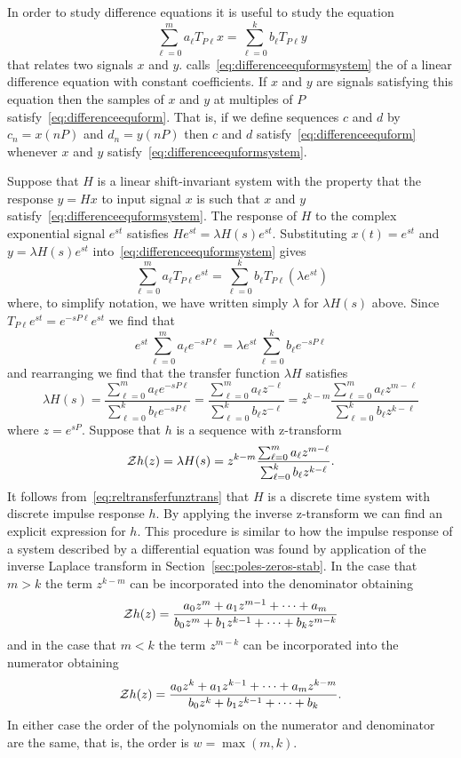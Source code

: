 In order to study difference equations it is useful to study the equation
\begin{equation}\label{eq:differenceequformsystem}
\sum_{\ell=0}^{m} a_\ell T_{P\ell} x = \sum_{\ell=0}^{k} b_\ell T_{P\ell} y
\end{equation}
that relates two signals $x$ and $y$.  \citet[Sec.~9.5]{Zemanian_dist_theory_1965} calls~\eqref{eq:differenceequformsystem} the  of a linear difference equation with constant coefficients.  If $x$ and $y$ are signals satisfying this equation then the samples of $x$ and $y$ at multiples of $P$ satisfy~\eqref{eq:differenceequform}.  That is, if we define sequences $c$ and $d$ by $c_n = x(nP)$ and $d_n = y(nP)$ then $c$ and $d$ satisfy~\eqref{eq:differenceequform} whenever $x$ and $y$ satisfy~\eqref{eq:differenceequformsystem}.

Suppose that $H$ is a linear shift-invariant system with the property that the response $y = H x$ to input signal $x$ is such that $x$ and $y$ satisfy~\eqref{eq:differenceequformsystem}.  The response of $H$ to the complex exponential signal $e^{st}$ satisfies $He^{st} = \lambda H(s) e^{st}$.  Substituting $x(t) = e^{st}$ and $y = \lambda H(s) e^{st}$ into~\eqref{eq:differenceequformsystem} gives
\[
\sum_{\ell=0}^{m} a_\ell T_{P\ell} e^{st} = \sum_{\ell=0}^{k} b_\ell T_{P\ell} (\lambda e^{st})
\]
where, to simplify notation, we have written simply $\lambda$ for $\lambda H(s)$ above.  Since $T_{P\ell} e^{st} = e^{-sP\ell} e^{st}$ we find that
\[
e^{st} \sum_{\ell=0}^{m} a_\ell e^{-sP\ell}  = \lambda e^{st} \sum_{\ell=0}^{k} b_\ell e^{-sP\ell}
\]
and rearranging we find that the transfer function $\lambda H$ satisfies
\[
\lambda H(s) = \frac{\sum_{\ell=0}^{m} a_\ell e^{-sP\ell}}{\sum_{\ell=0}^{k} b_\ell e^{-sP\ell}} = \frac{\sum_{\ell=0}^{m} a_\ell z^{-\ell}}{\sum_{\ell=0}^{k} b_\ell z^{-\ell}} = z^{k-m} \frac{\sum_{\ell=0}^{m} a_\ell z^{m-\ell}}{\sum_{\ell=0}^{k} b_\ell z^{k-\ell}}
\]
where $z = e^{sP}$.  Suppose that $h$ is a sequence with z-transform
\[
{\mathcal Z} h(z) = \lambda H(s) = z^{k-m} \frac{\sum_{\ell=0}^{m} a_\ell z^{m-\ell}}{\sum_{\ell=0}^{k} b_\ell z^{k-\ell}}.
\]
It follows from~\eqref{eq:reltransferfunztrans} that $H$ is a discrete time system with discrete impulse response $h$.  By applying the inverse z-transform we can find an explicit expression for $h$.  This procedure is similar to how the impulse response of a system described by a differential equation was found by application of the inverse Laplace transform in Section~\ref{sec:poles-zeros-stab}.  In the case that $m > k$ the term $z^{k-m}$ can be incorporated into the denominator obtaining
\[
{\mathcal Z} h(z) = \frac{a_0z^m + a_1 z^{m-1} + \dots + a_m}{b_0z^m + b_1 z^{k-1} + \dots + b_k z^{m-k}}
\]
and in the case that $m < k$ the term $z^{m-k}$ can be incorporated into the numerator obtaining
\[
{\mathcal Z} h(z) = \frac{a_0z^k + a_1 z^{k-1} + \dots + a_m z^{k-m}}{b_0z^k + b_1 z^{k-1} + \dots + b_k}.
\] 
In either case the order of the polynomials on the numerator and denominator are the same, that is, the order is $w = \max(m,k)$.

